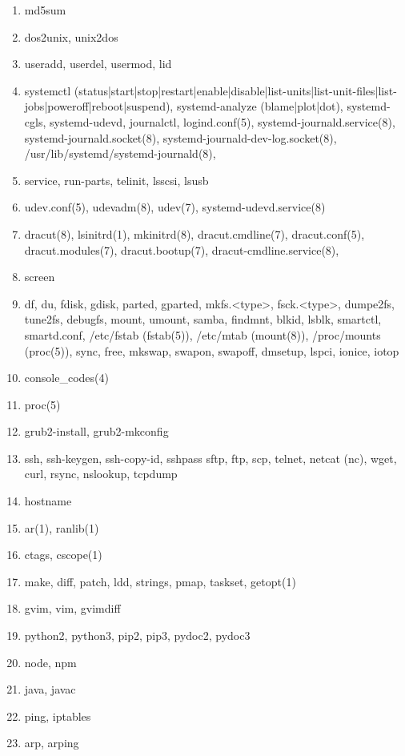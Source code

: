 \documentclass{article}
\begin{document}
\begin{enumerate}
\begin{enumerate}
            \item md5sum
            \item dos2unix, unix2dos
            \item useradd, userdel, usermod, lid
            \item systemctl (status|start|stop|restart|enable|disable|list-units|list-unit-files|list-jobs|poweroff|reboot|suspend), systemd-analyze (blame|plot|dot), systemd-cgls, systemd-udevd, journalctl, logind.conf(5), systemd-journald.service(8), systemd-journald.socket(8), systemd-journald-dev-log.socket(8), /usr/lib/systemd/systemd-journald(8),
            \item service, run-parts, telinit, lsscsi, lsusb
            \item udev.conf(5), udevadm(8), udev(7), systemd-udevd.service(8)
            \item dracut(8), lsinitrd(1), mkinitrd(8), dracut.cmdline(7), dracut.conf(5), dracut.modules(7), dracut.bootup(7), dracut-cmdline.service(8),
            \item screen
            \item df, du, fdisk, gdisk, parted, gparted, mkfs.<type>, fsck.<type>, dumpe2fs, tune2fs, debugfs, mount, umount, samba, findmnt, blkid, lsblk, smartctl, smartd.conf, /etc/fstab (fstab(5)), /etc/mtab (mount(8)), /proc/mounts (proc(5)), sync, free, mkswap, swapon, swapoff, dmsetup, lspci, ionice, iotop
            \item console_codes(4)
            \item proc(5)
            \item grub2-install, grub2-mkconfig
            \item ssh, ssh-keygen, ssh-copy-id, sshpass sftp, ftp, scp, telnet, netcat (nc), wget, curl, rsync, nslookup, tcpdump
            \item hostname
            \item ar(1), ranlib(1)
            \item ctags, cscope(1)
            \item make, diff, patch, ldd, strings, pmap, taskset, getopt(1)
            \item gvim, vim, gvimdiff
            \item python2, python3, pip2, pip3, pydoc2, pydoc3
            \item node, npm
            \item java, javac
            \item ping, iptables
            \item arp, arping

\end{enumerate}
\end{enumerate}
\end{document}
